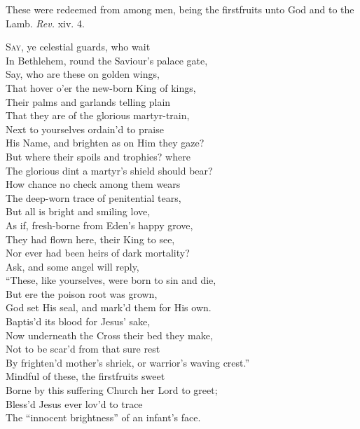 
These were redeemed from among men, being the firstfruits unto God and to the Lamb. \emph{Rev.} xiv. 4.

\textsc{Say}, ye celestial guards, who wait \\
 In Bethlehem, round the Saviour’s palace gate, \\
 Say, who are these on golden wings, \\
 That hover o’er the new-born King of kings, \\
 Their palms and garlands telling plain \\
 That they are of the glorious martyr-train, \\
 Next to yourselves ordain’d to praise \\
 His Name, and brighten as on Him they gaze? \\
  But where their spoils and trophies? where \\
 The glorious dint a martyr’s shield should bear? \\
 How chance no check among them wears \\
 The deep-worn trace of penitential tears, \\
 But all is bright and smiling love, \\
 As if, fresh-borne from Eden’s happy grove, \\
 They had flown here, their King to see, \\
 Nor ever had been heirs of dark mortality? \\
  Ask, and some angel will reply, \\
 “These, like yourselves, were born to sin and die, \\
 But ere the poison root was grown, \\
 God set His seal, and mark’d them for His own. \\
 Baptis’d its blood for Jesus’ sake, \\
 Now underneath the Cross their bed they make, \\
 Not to be scar’d from that sure rest \\
 By frighten’d mother’s shriek, or warrior’s waving crest.” \\
  Mindful of these, the firstfruits sweet \\
 Borne by this suffering Church her Lord to greet; \\
 Bless’d Jesus ever lov’d to trace \\
 The “innocent brightness” of an infant’s face. \\
